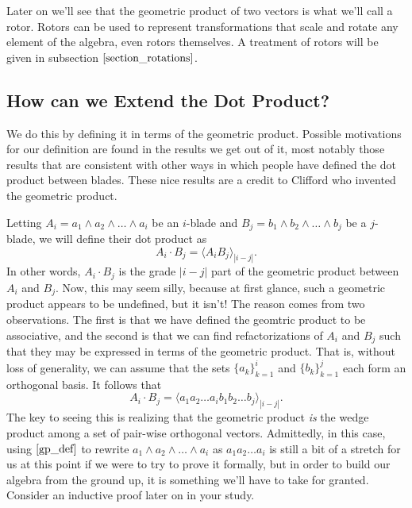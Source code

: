 \documentclass{article}
\begin{document}
Later on we'll see that the geometric product of two
vectors is what we'll call a rotor.  Rotors can be used
to represent transformations that scale and rotate any
element of the algebra, even rotors themselves.
A treatment of rotors will be given in subsection $\eqref{section_rotations}$.

\subsection{How can we Extend the Dot Product?}\label{dot_extend_section}

We do this by defining it in terms of the geometric product.
Possible motivations for our definition are found in the results
we get out of it, most notably those results that are consistent
with other ways in which people have defined the dot product between
blades.  These nice results are a credit to
Clifford who invented the geometric product.

Letting $A_i=a_1\wedge a_2\wedge\dots\wedge a_i$ be an
$i$-blade and $B_j=b_1\wedge b_2\wedge\dots\wedge b_j$
be a $j$-blade, we will define their dot product as
\begin{equation*}
A_i\cdot B_j = \langle A_iB_j\rangle_{|i-j|}.
\end{equation*}
In other words, $A_i\cdot B_j$ is the grade $|i-j|$ part
of the geometric product between $A_i$ and $B_j$.  Now, this
may seem silly, because at first glance, such a geometric
product appears to be undefined, but it isn't!  The reason comes
from two observations.  The first is that we have defined
the geomtric product to be associative, and the second is
that we can find refactorizations of $A_i$ and $B_j$
such that they may be expressed in terms of the geometric product.
That is, without loss of generality, we can assume
that the sets $\{a_k\}_{k=1}^i$ and $\{b_k\}_{k=1}^j$ each
form an orthogonal basis.  It follows that
\begin{equation*}
A_i\cdot B_j = \langle a_1a_2\dots a_ib_1b_2\dots b_j\rangle_{|i-j|}.
\end{equation*}
The key to seeing this is realizing that the geometric product \emph{is}
the wedge product among a set of pair-wise orthogonal vectors.
Admittedly, in this case, using $\eqref{gp_def}$ to rewrite $a_1\wedge a_2\wedge\dots\wedge a_i$
as $a_1a_2\dots a_i$ is still a bit of a stretch for us at this point if we were to try
to prove it formally, but in order to build our algebra from the ground up, it is something
we'll have to take for granted.  Consider an inductive proof later on in your study.
\end{document}
